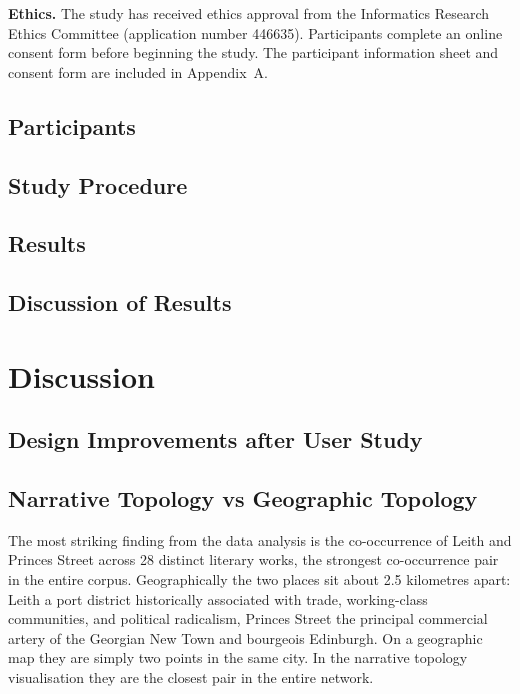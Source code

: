 \documentclass[logo,msc]{infthesis}
\begin{document}
\textbf{Ethics.} The study has received ethics approval from the Informatics Research Ethics Committee (application number 446635). Participants complete an online consent form before beginning the study. The participant information sheet and consent form are included in Appendix~A.
 
\section{Participants}

\section{Study Procedure}

\section{Results}

\section{Discussion of Results}
 
 
\chapter{Discussion}
\label{chap:discussion}
 
\section{Design Improvements after User Study}
 
\section{Narrative Topology vs Geographic Topology}
 
The most striking finding from the data analysis is the co-occurrence of Leith and Princes Street across 28 distinct literary works, the strongest co-occurrence pair in the entire corpus. Geographically the two places sit about 2.5 kilometres apart: Leith a port district historically associated with trade, working-class communities, and political radicalism, Princes Street the principal commercial artery of the Georgian New Town and bourgeois Edinburgh. On a geographic map they are simply two points in the same city. In the narrative topology visualisation they are the closest pair in the entire network.
\end{document}

